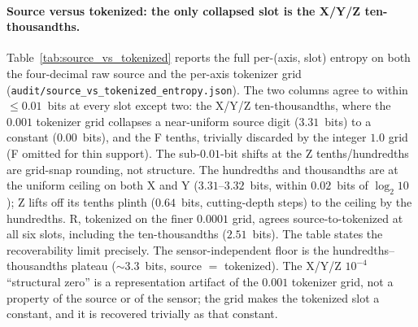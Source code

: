 \documentclass[entropy,article,submit,moreauthors,pdftex]{Definitions/mdpi}
\begin{document}
\paragraph{Source versus tokenized: the only collapsed slot is the X/Y/Z ten-thousandths.} Table~\ref{tab:source_vs_tokenized} reports the full per-(axis, slot) entropy on both the four-decimal raw source and the per-axis tokenizer grid (\texttt{audit/source\_vs\_tokenized\_entropy.json}). The two columns agree to within $\le\!0.01$~bits at every slot except two: the X/Y/Z ten-thousandths, where the $0.001$ tokenizer grid collapses a near-uniform source digit ($3.31$~bits) to a constant ($0.00$~bits), and the F tenths, trivially discarded by the integer $1.0$ grid (F omitted for thin support). The sub-$0.01$-bit shifts at the Z tenths/hundredths are grid-snap rounding, not structure. The hundredths and thousandths are at the uniform ceiling on both X and Y ($3.31$--$3.32$~bits, within $0.02$~bits of $\log_2 10$); Z lifts off its tenths plinth ($0.64$~bits, cutting-depth steps) to the ceiling by the hundredths. R, tokenized on the finer $0.0001$ grid, agrees source-to-tokenized at all six slots, including the ten-thousandths ($2.51$~bits). The table states the recoverability limit precisely. The sensor-independent floor is the hundredths--thousandths plateau ($\sim\!3.3$~bits, source $=$ tokenized). The X/Y/Z $10^{-4}$ ``structural zero'' is a representation artifact of the $0.001$ tokenizer grid, not a property of the source or of the sensor; the grid makes the tokenized slot a constant, and it is recovered trivially as that constant.
\end{document}

